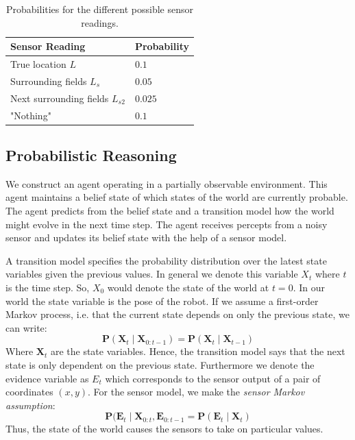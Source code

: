 \documentclass{article}
\begin{document}
\begin{table}[ht]
\centering
  \begin{tabular}{ | l | l | }
    \hline
    \textbf{Sensor Reading}             & \textbf{Probability}  \\ \hline
    True location $L$                   & $0.1$                 \\ \hline
    Surrounding fields $L_s$            & $0.05$                \\ \hline
    Next surrounding fields $L_{s2}$    & $0.025$               \\ \hline
    "Nothing"                           & $0.1$                 \\ \hline
  \end{tabular}
  \caption{Probabilities for the different possible sensor readings.}
  \label{tab:sensor}
\end{table}

\subsection{Probabilistic Reasoning}
We construct an agent operating in a partially observable environment. This agent maintains a belief state of which states of the world are currently probable. The agent predicts from the belief state and a transition model how the world might evolve in the next time step. The agent receives percepts from a noisy sensor and updates its belief state with the help of a sensor model.

A transition model specifies the probability distribution over the latest state variables given the previous values. In general we denote this variable $X_t$ where $t$ is the time step. So, $X_0$ would denote the state of the world at $t = 0$. In our world the state variable is the pose of the robot. If we assume a first-order Markov process, i.e. that the current state depends on only the previous state, we can write: 
\begin{displaymath}
\textbf{P}(\textbf{X}_t \mid \textbf{X}_{0:t-1}) = \textbf{P}(\textbf{X}_t \mid \textbf{X}_{t-1})
\end{displaymath} Where $\textbf{X}_t$ are the state variables. Hence, the transition model says that the next state is only dependent on the previous state.
Furthermore we denote the evidence variable as $E_t$ which corresponds to the sensor output of a pair of coordinates $(x, y)$. For the sensor model, we make the \emph{sensor Markov assumption}:
\begin{displaymath}
\textbf{P}(\textbf{E}_t \mid \textbf{X}_{0:t}, \textbf{E}_{0:t-1} = \textbf{P}(\textbf{E}_t \mid \textbf{X}_t)
\end{displaymath} Thus, the state of the world causes the sensors to take on particular values.
\end{document}
